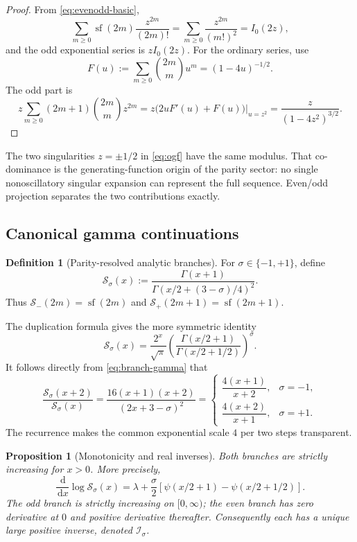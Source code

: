 \documentclass[11pt,a4paper]{article}
\numberwithin{equation}{section}
\newtheorem{proposition}[theorem]{Proposition}
\theoremstyle{definition}
\newtheorem{definition}[theorem]{Definition}
\theoremstyle{remark}
\newcommand{\dd}{\,\mathrm d}
\newcommand{\SF}{\operatorname{sf}}
\begin{document}
\begin{proof}
From \cref{eq:evenodd-basic},
\[
 \sum_{m\ge0}\SF(2m)\frac{z^{2m}}{(2m)!}
 =\sum_{m\ge0}\frac{z^{2m}}{(m!)^2}=I_0(2z),
\]
and the odd exponential series is \(zI_0(2z)\).  For the ordinary series,
use
\[
 F(u):=\sum_{m\ge0}\binom{2m}{m}u^m=(1-4u)^{-1/2}.
\]
The odd part is
\[
 z\sum_{m\ge0}(2m+1)\binom{2m}{m}z^{2m}
 =z\bigl(2uF'(u)+F(u)\bigr)\big|_{u=z^2}
 =\frac{z}{(1-4z^2)^{3/2}}.
\]
\end{proof}

The two singularities \(z=\pm1/2\) in \cref{eq:ogf} have the same modulus.
That co-dominance is the generating-function origin of the parity sector:
no single nonoscillatory singular expansion can represent the full sequence.
Even/odd projection separates the two contributions exactly.

\subsection{Canonical gamma continuations}

\begin{definition}[Parity-resolved analytic branches]\label{def:branches}
For \(\sigma\in\{-1,+1\}\), define
\begin{equation}\label{eq:branch-gamma}
 \mathcal S_\sigma(x)
 :=\frac{\Gamma(x+1)}
 {\Gamma\!\left(x/2+(3-\sigma)/4\right)^2}.
\end{equation}
Thus \(\mathcal S_-(2m)=\SF(2m)\) and
\(\mathcal S_+(2m+1)=\SF(2m+1)\).
\end{definition}

The duplication formula gives the more symmetric identity
\begin{equation}\label{eq:branch-ratio}
 \mathcal S_\sigma(x)
 =\frac{2^x}{\sqrt\pi}
 \left(\frac{\Gamma(x/2+1)}{\Gamma(x/2+1/2)}\right)^\sigma.
\end{equation}
It follows directly from \cref{eq:branch-gamma} that
\begin{equation}\label{eq:step-two}
 \frac{\mathcal S_\sigma(x+2)}{\mathcal S_\sigma(x)}
 =\frac{16(x+1)(x+2)}{(2x+3-\sigma)^2}
 =\begin{cases}
   \dfrac{4(x+1)}{x+2},&\sigma=-1,\\[2mm]
   \dfrac{4(x+2)}{x+1},&\sigma=+1.
  \end{cases}
\end{equation}
The recurrence makes the common exponential scale \(4\) per two steps
transparent.

\begin{proposition}[Monotonicity and real inverses]\label{prop:monotone}
Both branches are strictly increasing for \(x>0\).  More precisely,
\begin{equation}\label{eq:logder}
 \frac{\dd}{\dd x}\log\mathcal S_\sigma(x)
 =\lambda+\frac\sigma2
 \left[\psi(x/2+1)-\psi(x/2+1/2)\right].
\end{equation}
The odd branch is strictly increasing on \([0,\infty)\); the even branch has
zero derivative at \(0\) and positive derivative thereafter.  Consequently
each has a unique large positive inverse, denoted \(\mathcal I_\sigma\).
\end{proposition}
\end{document}
